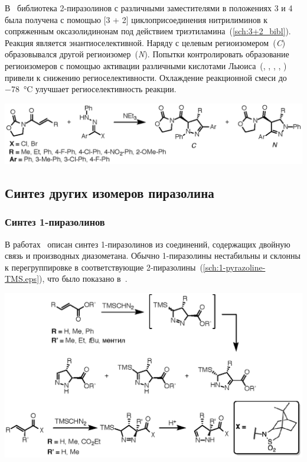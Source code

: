 В~\cite{Manyem2007} библиотека 2-пиразолинов с различными заместителями в положениях 3 и 4 была получена с помощью [3 + 2] циклоприсоединения нитрилиминов к сопряженным оксазолидинонам под действием триэтиламина~(\ref{sch:3+2_bibl}).
Реакция является энантиоселективной. Наряду с целевым региоизомером~(\emph{C}) образовывался другой региоизомер~(\emph{N}).
Попытки контролировать образование региоизомеров с помощью активации различными кислотами Льюиса~(, , , , ) привели к снижению региоселективности.
Охлаждение реакционной смеси до \SI{-78}{\celsius} улучшает региоселективность реакции.

\begin{scheme}
    \centering
    \includegraphics{sections/literature/img/3+2_bibl.eps}
    \caption{}
    \label{sch:3+2_bibl}
\end{scheme}
\FloatBarrier

\subsection{Синтез других изомеров пиразолина}

\subsubsection{Синтез 1-пиразолинов}
В работах~\cite{Baldwin1990, Mish1997, Simovic2007, Sun2013} описан синтез 1-пиразолинов из соединений, содержащих двойную связь и производных диазометана.
Обычно 1-пиразолины нестабильны и склонны к перегруппировке в соответствующие 2-пиразолины~(\ref{sch:1-pyrazoline-TMS.eps}), что было показано в~\cite{Mish1997, Simovic2007}.

\begin{scheme}[h!]
    \centering
    \includegraphics{sections/literature/img/1-pyrazoline-TMS.eps}
    \caption{}
    \label{sch:1-pyrazoline-TMS.eps}
\end{scheme}


